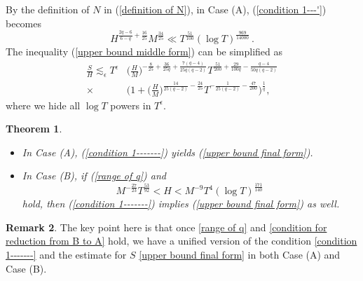 \documentclass[11pt]{amsart}
\numberwithin{equation}{section}
\newtheorem{theorem}{Theorem}[section]
\theoremstyle{definition}
\newtheorem{remark}[theorem]{Remark}
\theoremstyle{proposition}
\begin{document}
By the definition of $N$ in (\ref{definition of N}), in Case (A), (\ref{condition 1---'}) becomes 
\begin{equation}  \label{condition 1-------}
H^{\frac{2q-6}{6-q}+\frac{16}{25}}M^{\frac{34}{25}}\ll T^{\frac{51}{100}}(\log T)^{\frac{969}{14000}}  \,.  
\end{equation}
The inequality (\ref{upper bound middle form}) can be simplified as 
\begin{equation}  \label{upper bound final form}
\begin{split}
\frac{S}{H} \lesssim_\epsilon T^\epsilon & \Big(\frac{H}{M} \Big)^{-\frac{8}{25}+\frac{36}{25q}+\frac{7(q-4)}{25q(q-2)}} T^{\frac{51}{200}+\frac{29}{100q}-\frac{q-4}{50q(q-2)}}
\\ \times & \Big(1+\Big(\frac{H}{M} \Big)^{\frac{14}{25(q-2)}-\frac{24}{25}} T^{-\frac{1}{25(q-2)}-\frac{47}{200}} \Big)^{\frac{1}{q}} ,
\end{split}   
\end{equation}
where we hide all $\log T$ powers in $T^\epsilon$.\\




\begin{theorem} \label{main theorem}
\quad 
\begin{itemize}
\item  In Case (A),   (\ref{condition 1-------}) yields  (\ref{upper bound final form}). 
\item  In Case (B), if (\ref{range of q}) and 
\begin{equation}   \label{condition for reduction from B to A}
M^{-\frac{27}{23}}T^{\frac{53}{92}}<H<M^{-9}T^4 (\log T)^{\frac{171}{140}}  \,
\end{equation}
hold, then (\ref{condition 1-------}) implies  (\ref{upper bound final form}) as well. 
\end{itemize}
\end{theorem}




 


\begin{remark}
The key point here is that once \eqref{range of q} and \eqref{condition for reduction from B to A} hold, we have a unified version of the condition \eqref{condition 1-------} and the estimate for $S$ \eqref{upper bound final form} in both Case (A) and Case (B).
\end{remark}
\end{document}
